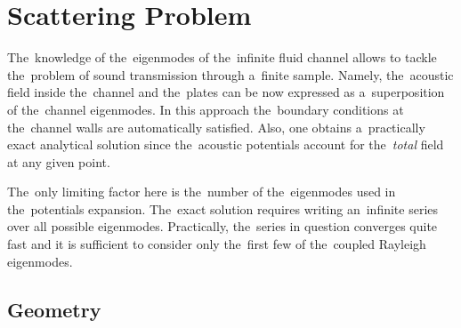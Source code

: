 

\section{Scattering Problem}

The~knowledge of the~eigenmodes of the~infinite fluid channel allows to tackle the~problem of sound transmission through a~finite sample.
Namely, the~acoustic field inside the~channel and the~plates can be now expressed as a~superposition of the~channel eigenmodes.
In this approach the~boundary conditions at the~channel walls are automatically satisfied.
Also, one obtains a~practically exact analytical solution since the~acoustic potentials account for the~\textit{total} field at any given point.

The~only limiting factor here is the~number of the~eigenmodes used in the~potentials expansion.
The~exact solution requires writing an~infinite series over all possible eigenmodes.
Practically, the~series in question converges quite fast and it is sufficient to consider only the~first few of the~coupled Rayleigh eigenmodes.

\subsection{Geometry}

